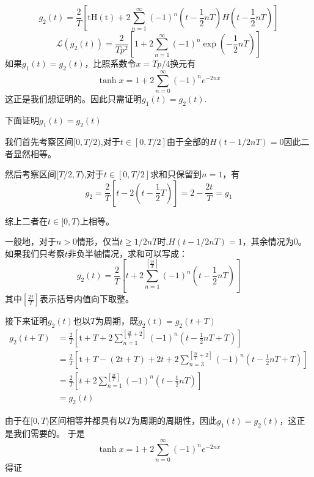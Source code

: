 \documentclass[a4paper]{ctexart}
\begin{document}
\subsection{}
$$
    g_2\left( t \right) =\frac{2}{T}\left[ \text{tH}\left( \text{t} \right) +2\sum_{n=1}^{\infty}{\left( -1 \right)}^n\left( t-\frac{1}{2}nT \right) H\left( t-\frac{1}{2}nT \right) \right]
$$
$$
    \mathcal{L}\left( g_2\left( t \right) \right) =\frac{2}{Tp^2}\left[ 1+2\sum_{n=1}^{\infty}{\left( -1 \right)}^n\exp \left( -\frac{1}{2}nT \right) \right]
$$
如果$g_1(t)=g_2(t)$，比照系数令$x=Tp/4$换元有
$$
    \tanh x=1+2 \sum_{n=0}^{\infty}(-1)^{n} e^{-2 n x}
$$
这正是我们想证明的。因此只需证明$g_1(t)=g_2(t)$.

下面证明$g_1(t)=g_2(t)$

我们首先考察区间$[0,T/2)$,对于$t\in [0,T/2]$由于全部的$H(t-1/2nT)=0$因此二者显然相等。

然后考察区间$[T/2,T)$,对于$t\in [0,T/2]$求和只保留到$n=1$，有
$$
    g_2=\frac{2}{T}\left[ t-2\left( t-\frac{1}{2}T \right) \right] =2-\frac{2t}{T}=g_1
$$

综上二者在$t\in [0,T)$上相等。

一般地，对于$n>0$情形，仅当$t\geq 1/2nT$时,$H(t-1/2nT)=1$，其余情况为0。如果我们只考察$t$非负半轴情况，求和可以写成：
$$
    g_2\left( t \right) =\frac{2}{T}\left[ t +2\sum_{n=1}^{\left[ \frac{2t}{T} \right]}{\left( -1 \right)}^n\left( t-\frac{1}{2}nT \right) \right]
$$
其中$\left[ \frac{2t}{T} \right]$表示括号内值向下取整。

接下来证明$g_2(t)$也以$T$为周期，既$g_2(t)=g_2(t+T)$
$$
    \begin{aligned}
        g_2\left( t+T \right)
         & =\frac{2}{T}\left[ \text{t}+T+2\sum_{n=1}^{\left[ \frac{2t}{T}+2 \right]}{\left( -1 \right)}^n\left( t-\frac{1}{2}nT+T \right) \right]                         \\
         & =\frac{2}{T}\left[ \text{t}+T-\left( 2t+T \right) +2t+2\sum_{n=3}^{\left[ \frac{2t}{T}+2 \right]}{\left( -1 \right)}^n\left( t-\frac{1}{2}nT+T \right) \right] \\
         & =\frac{2}{T}\left[ t+2\sum_{n=1}^{\left[ \frac{2t}{T} \right]}{\left( -1 \right)}^n\left( t-\frac{1}{2}nT \right) \right]                                      \\
         & =g_2\left( t \right)
    \end{aligned}
$$

由于在$[0,T)$区间相等并都具有以$T$为周期的周期性，因此$g_1(t)=g_2(t)$，这正是我们需要的。
于是
$$
    \tanh x=1+2 \sum_{n=0}^{\infty}(-1)^{n} e^{-2 n x}
$$
得证
\end{document}
